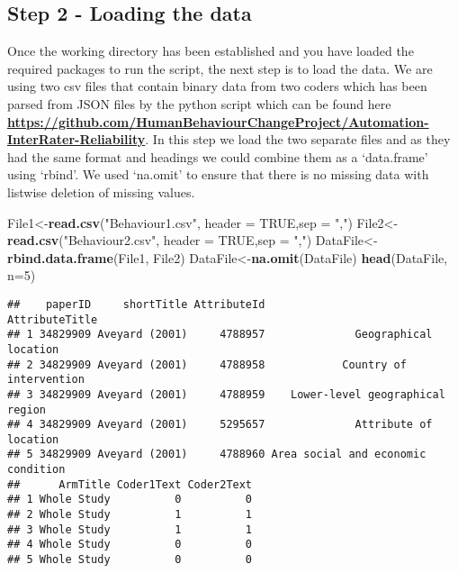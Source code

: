 \documentclass[]{article}
\newenvironment{Shaded}{\begin{snugshade}}{\end{snugshade}}
\newcommand{\KeywordTok}[1]{\textcolor[rgb]{0.13,0.29,0.53}{\textbf{#1}}}
\newcommand{\DataTypeTok}[1]{\textcolor[rgb]{0.13,0.29,0.53}{#1}}
\newcommand{\DecValTok}[1]{\textcolor[rgb]{0.00,0.00,0.81}{#1}}
\newcommand{\StringTok}[1]{\textcolor[rgb]{0.31,0.60,0.02}{#1}}
\newcommand{\OtherTok}[1]{\textcolor[rgb]{0.56,0.35,0.01}{#1}}
\newcommand{\NormalTok}[1]{#1}
\begin{document}
\subsection{Step 2 - Loading the data}\label{step-2---loading-the-data}

Once the working directory has been established and you have loaded the
required packages to run the script, the next step is to load the data.
We are using two csv files that contain binary data from two coders
which has been parsed from JSON files by the python script which can be
found here
\textbf{\url{https://github.com/HumanBehaviourChangeProject/Automation-InterRater-Reliability}}.
In this step we load the two separate files and as they had the same
format and headings we could combine them as a `data.frame' using
`rbind'. We used `na.omit' to ensure that there is no missing data with
listwise deletion of missing values.

\begin{Shaded}
\begin{Highlighting}[]
\NormalTok{File1<-}\KeywordTok{read.csv}\NormalTok{(}\StringTok{"Behaviour1.csv"}\NormalTok{, }\DataTypeTok{header =} \OtherTok{TRUE}\NormalTok{,}\DataTypeTok{sep =} \StringTok{","}\NormalTok{)}
\NormalTok{File2<-}\KeywordTok{read.csv}\NormalTok{(}\StringTok{"Behaviour2.csv"}\NormalTok{, }\DataTypeTok{header =} \OtherTok{TRUE}\NormalTok{,}\DataTypeTok{sep =} \StringTok{","}\NormalTok{)}
\NormalTok{DataFile<-}\KeywordTok{rbind.data.frame}\NormalTok{(File1, File2)}
\NormalTok{DataFile<-}\KeywordTok{na.omit}\NormalTok{(DataFile)}
\KeywordTok{head}\NormalTok{(DataFile, }\DataTypeTok{n=}\DecValTok{5}\NormalTok{)}
\end{Highlighting}
\end{Shaded}

\begin{verbatim}
##    paperID     shortTitle AttributeId                     AttributeTitle
## 1 34829909 Aveyard (2001)     4788957              Geographical location
## 2 34829909 Aveyard (2001)     4788958            Country of intervention
## 3 34829909 Aveyard (2001)     4788959    Lower-level geographical region
## 4 34829909 Aveyard (2001)     5295657              Attribute of location
## 5 34829909 Aveyard (2001)     4788960 Area social and economic condition
##      ArmTitle Coder1Text Coder2Text
## 1 Whole Study          0          0
## 2 Whole Study          1          1
## 3 Whole Study          1          1
## 4 Whole Study          0          0
## 5 Whole Study          0          0
\end{verbatim}
\end{document}
